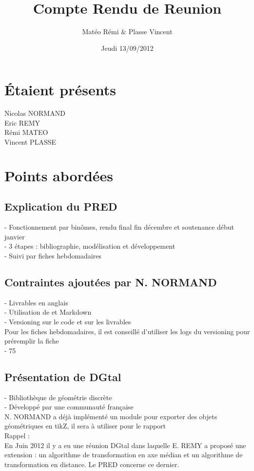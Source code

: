 \documentclass{article}
\title{Compte Rendu de Reunion}
\author{Matéo Rémi \& Plasse Vincent}
\date{Jeudi 13/09/2012}
\begin{document}
\maketitle

\section{Étaient présents}
Nicolas NORMAND \\
Eric REMY \\
Rémi MATEO \\
Vincent PLASSE \\


\section{Points abordées}
\subsection{Explication du PRED }
-	Fonctionnement par binômes, rendu final fin décembre et soutenance début janvier \\
-	3 étapes : bibliographie, modélisation et développement \\
-	Suivi par fiches hebdomadaires \\

\subsection{Contraintes ajoutées par N. NORMAND }
-	Livrables  en anglais \\
-	Utilisation de \LaTex et Markdown \\
-	Versioning sur le code et sur les livrables \\
Pour les fiches hebdomadaires, il est conseillé d’utiliser les logs du versioning pour préremplir la fiche \\
-	75%

\subsection{Présentation de DGtal }
-	Bibliothèque de géométrie discrète \\
-	Développé par une communauté française \\
N. NORMAND a déjà implémenté un module pour exporter des objets géométriques en tikZ, il sera à utiliser pour le rapport \\
Rappel : \\
En Juin 2012 il y a eu une réunion DGtal dans laquelle E. REMY a proposé une extension : un algorithme de transformation en axe médian et un algorithme de transformation en distance. Le PRED concerne ce dernier. \\
\end{document}
